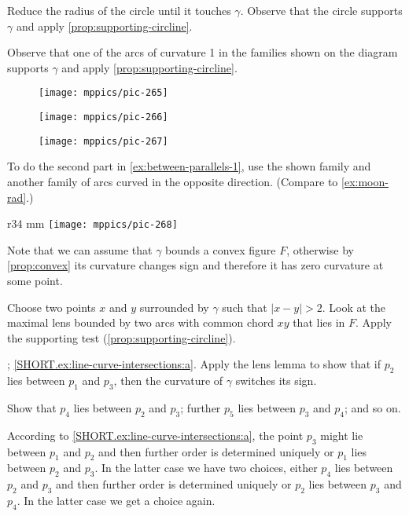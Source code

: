  Reduce the radius of the circle until it touches $\gamma$.
Observe that the circle supports $\gamma$ and apply \ref{prop:supporting-circline}.


Observe that one of the arcs of curvature 1 in the families shown on the diagram supports $\gamma$ and apply \ref{prop:supporting-circline}.
\begin{figure}[h!]
\begin{minipage}{.50\textwidth}
\centering
\texttt{[image: mppics/pic-265]}
\end{minipage}\hfill
\begin{minipage}{.26\textwidth}
\centering
\texttt{[image: mppics/pic-266]}
\end{minipage}
\hfill
\begin{minipage}{.20\textwidth}
\centering
\texttt{[image: mppics/pic-267]}
\end{minipage}
\end{figure}
To do the second part in \ref{ex:between-parallels-1}, use the shown family and another family of arcs curved in the opposite direction.
(Compare to \ref{ex:moon-rad}.) 

\begin{wrapfigure}[4]{r}{34 mm}
\vskip-0mm
\centering
\texttt{[image: mppics/pic-268]}
\vskip0mm
\end{wrapfigure}

Note that we can assume that $\gamma$ bounds a convex figure $F$, otherwise by \ref{prop:convex} its curvature changes sign and therefore it has zero curvature at some point.

Choose two points $x$ and $y$ surrounded by $\gamma$ such that $|x-y|>2$.
Look at the maximal lens bounded by two arcs with common chord $xy$ that lies in $F$.
Apply the supporting test (\ref{prop:supporting-circline}).

\parbf{\ref{ex:line-curve-intersections}}; \ref{SHORT.ex:line-curve-intersections:a}.
Apply the lens lemma to show that if $p_2$ lies between $p_1$ and $p_3$, then the curvature of $\gamma$ switches its sign.

 Show that $p_4$ lies between $p_2$ and $p_3$;
further $p_5$ lies between $p_3$ and $p_4$;
and so on.

According to \ref{SHORT.ex:line-curve-intersections:a}, the point $p_3$ might lie between $p_1$ and $p_2$ and then further order is determined uniquely or $p_1$ lies between $p_2$ and $p_3$.
In the latter case we have two choices, either $p_4$ lies between $p_2$ and $p_3$ and then further order is determined uniquely or $p_2$ lies between $p_3$ and $p_4$.
In the latter case we get a choice again.

